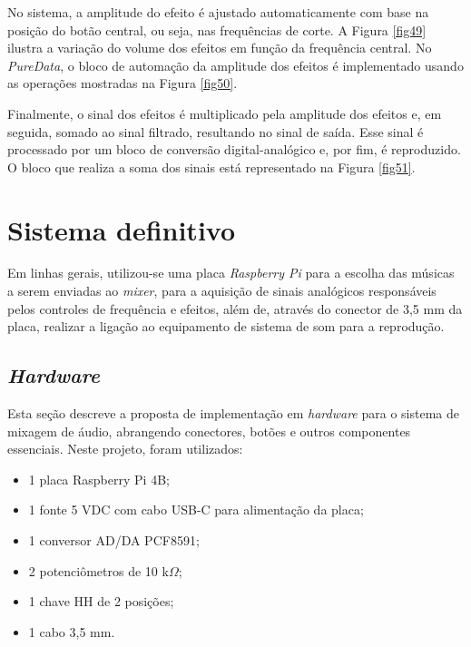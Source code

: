 No sistema, a amplitude do efeito é ajustado automaticamente com base na posição do botão central, ou seja, nas frequências de corte. A Figura \ref{fig49} ilustra a variação do volume dos efeitos em função da frequência central. %
No \textit{PureData}, o bloco de automação da amplitude dos efeitos é implementado usando as operações mostradas na Figura \ref{fig50}.


Finalmente, o sinal dos efeitos é multiplicado pela amplitude dos efeitos e, em seguida, somado ao sinal filtrado, resultando no sinal de saída. Esse sinal é processado por um bloco de conversão digital-analógico e, por fim, é reproduzido. O bloco que realiza a soma dos sinais está representado na Figura \ref{fig51}.

\section{Sistema definitivo} %

Em linhas gerais, %
utilizou-se uma placa \textit{Raspberry Pi} para a escolha das músicas a serem enviadas ao \textit{mixer}, para a aquisição de sinais analógicos responsáveis pelos controles de frequência e efeitos, além de, através do conector de 3,5 mm da placa, realizar a ligação ao equipamento de sistema de som para a reprodução. 

\subsection{\textit{Hardware}}

Esta seção descreve a proposta de implementação em \textit{hardware} para o sistema de mixagem de áudio, abrangendo conectores, botões e outros componentes essenciais. Neste projeto, foram utilizados:

\begin{itemize}%
    \item 1 placa Raspberry Pi 4B;
    \item 1 fonte 5 VDC com cabo USB-C para alimentação da placa;
    \item 1 conversor AD/DA PCF8591;
    \item 2 potenciômetros de 10 k$\Omega$;
    \item 1 chave HH de 2 posições;
    \item 1 cabo 3,5 mm.
\end{itemize}

